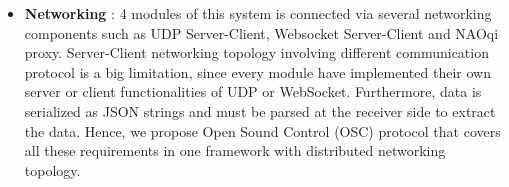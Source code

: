 \begin{itemize}
	\item \textbf{Networking} : 4 modules of this system is connected via several networking components such as UDP Server-Client, Websocket Server-Client and NAOqi proxy. Server-Client networking topology involving different communication protocol is a big limitation, since every module have implemented their own server or client functionalities of UDP or WebSocket. Furthermore, data is serialized as JSON strings and must be parsed at the receiver side to extract the data. Hence, we propose Open Sound Control (OSC) protocol that covers all these requirements in one framework with distributed networking topology.

\end{itemize}


